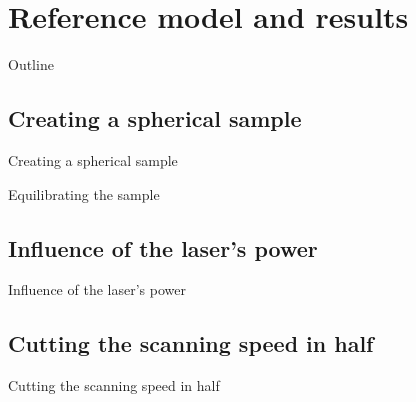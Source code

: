 \section{Reference model and results}
\begin{frame}{Outline}
	\tableofcontents[currentsection]
\end{frame}


\subsection{Creating a spherical sample}
\begin{frame}{Creating a spherical sample}
	\missing
\end{frame}


\begin{frame}{Equilibrating the sample}
	\missing
\end{frame}


\subsection{Influence of the laser's power}
\begin{frame}{Influence of the laser's power}
	\missing
\end{frame}


\subsection{Cutting the scanning speed in half}
\begin{frame}{Cutting the scanning speed in half}
	\missing
\end{frame}
